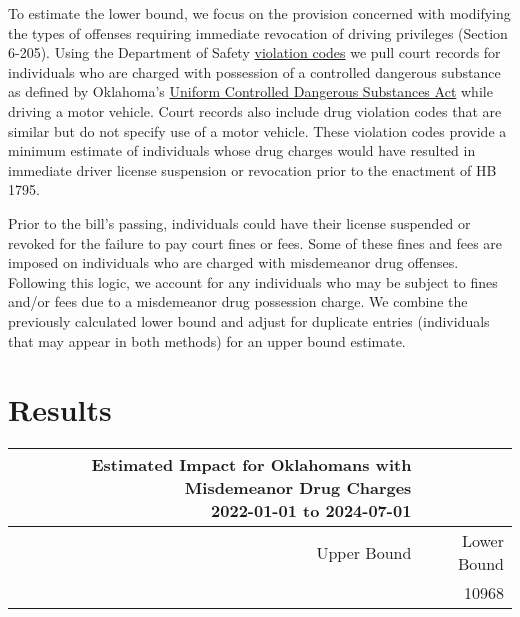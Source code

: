 \documentclass[
  letterpaper,
  DIV=11,
  numbers=noendperiod]{scrartcl}
\begin{document}
To estimate the lower bound, we focus on the provision concerned with
modifying the types of offenses requiring immediate revocation of
driving privileges (Section 6-205). Using the Department of Safety
\href{https://oklahoma.gov/content/dam/ok/en/dps/VCB\%20February\%202022.pdf}{violation
codes} we pull court records for individuals who are charged with
possession of a controlled dangerous substance as defined by Oklahoma's
\href{http://www.oklegislature.gov/cf_pdf/2003-04\%20INT/hb/HB2166\%20int.pdf}{Uniform
Controlled Dangerous Substances Act} while driving a motor vehicle.
Court records also include drug violation codes that are similar but do
not specify use of a motor vehicle. These violation codes provide a
minimum estimate of individuals whose drug charges would have resulted
in immediate driver license suspension or revocation prior to the
enactment of HB 1795.

Prior to the bill's passing, individuals could have their license
suspended or revoked for the failure to pay court fines or fees. Some of
these fines and fees are imposed on individuals who are charged with
misdemeanor drug offenses. Following this logic, we account for any
individuals who may be subject to fines and/or fees due to a misdemeanor
drug possession charge. We combine the previously calculated lower bound
and adjust for duplicate entries (individuals that may appear in both
methods) for an upper bound estimate.

\section{Results}\label{results}

\begingroup
\fontsize{12.0pt}{14.4pt}\selectfont
\begin{longtable*}{rr}
\caption*{
{\large Estimated Impact for Oklahomans with Misdemeanor Drug Charges} \\ 
{\small 2022-01-01 to 2024-07-01}
} \\ 
\toprule
Upper Bound & Lower Bound \\ 
\midrule{} & {10968} \\ 
\bottomrule
\end{longtable*}
\endgroup
\end{document}
